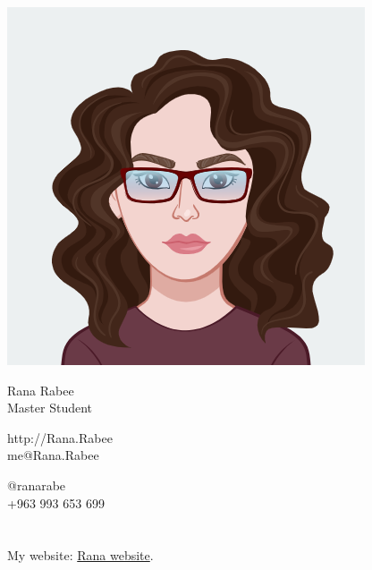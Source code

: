 \documentclass{article}
\begin{document}
\centering \includegraphics[width=.25\linewidth]{Avatar_logo}\\[5pt]
\parbox{2in}{\Large \centering Rana Rabee\\[1pt]
\normalsize Master Student}

\vfill
\raggedright
\begin{multicols}{2}
http://Rana.Rabee\\
me@Rana.Rabee

\columnbreak
\raggedleft
@ranarabe\\
+963 993 653 699%
\end{multicols}%



\section*{}
My website: 
\href{https://ranarabe.github.io/}{Rana website}.
\end{document}
